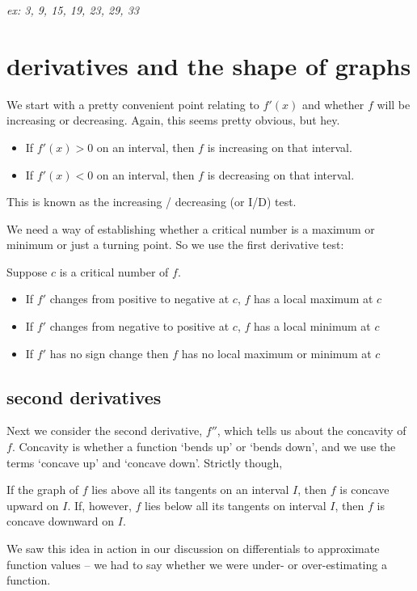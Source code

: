 \documentclass[10pt,a4paper]{report}
\begin{document}
\emph{ex: 3, 9, 15, 19, 23, 29, 33}

\section{derivatives and the shape of graphs}


We start with a pretty convenient point relating to $f'(x)$ and whether $f$ will be increasing or decreasing. Again, this seems pretty obvious, but hey.

\begin{itemize}
	\item If $f'(x) > 0$ on an interval, then $f$ is increasing on that interval.
	\item If $f'(x) < 0$ on an interval, then $f$ is decreasing on that interval.
\end{itemize}

This is known as the increasing / decreasing (or I/D) test.

We need a way of establishing whether a critical number is a maximum or minimum or just a turning point. So we use the first derivative test:

Suppose $c$ is a critical number of $f$.

\begin{itemize}
	\item If $f'$ changes from positive to negative at $c$, $f$ has a local maximum at $c$
	\item If $f'$ changes from negative to positive at $c$, $f$ has a local minimum at $c$
	\item If $f'$ has no sign change then $f$ has no local maximum or minimum at $c$
\end{itemize}


\subsection{second derivatives}

Next we consider the second derivative, $f''$, which tells us about the concavity of $f$. Concavity is whether a function `bends up' or `bends down', and we use the terms `concave up' and `concave down'. Strictly though,

If the graph of $f$ lies above all its tangents on an interval $I$, then $f$ is concave upward on $I$. If, however, $f$ lies below all its tangents on interval $I$, then $f$ is concave downward on $I$.

We saw this idea in action in our discussion on differentials to approximate function values -- we had to say whether we were under- or over-estimating a function.
\end{document}
